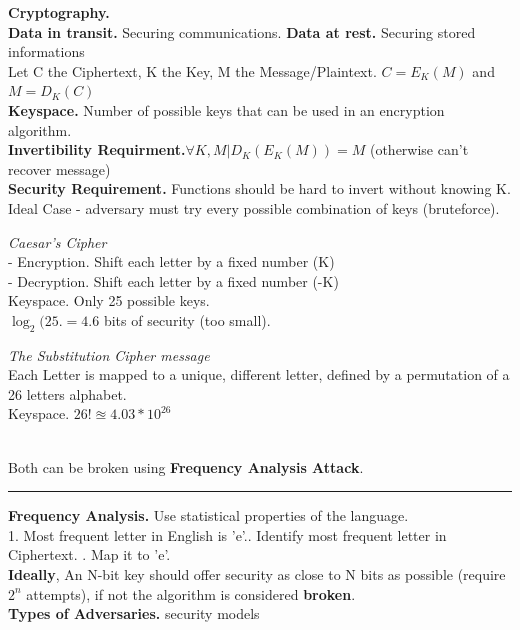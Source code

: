 \documentclass[9pt, a4paper]{extarticle}
\makeatletter
\renewcommand{\hline}{\noalign{\vskip 2px}\hrule\@height\arrayrulewidth\@width\linewidth\noalign{\vskip 2px}}
\makeatother
\begin{document}
\begin{minipage}[t]{0.495\textwidth}
	\vspace*{-7px}
	\textbf{Cryptography.}\\
	\textbf{Data in transit.} Securing communications. \textbf{Data at rest.} Securing stored informations\\
	Let C the Ciphertext, K the Key, M the Message/Plaintext.
	$C = E_K(M)$ and $M = D_K(C)$\\
	\textbf{Keyspace.} Number of possible keys that can be used in an encryption algorithm.\\
	\textbf{Invertibility Requirment.}$\forall K, M | D_K(E_K(M)) = M$ (otherwise can't recover message)\\
	\textbf{Security Requirement.} Functions should be hard to invert without knowing K.\\
	Ideal Case - adversary must try every possible combination of keys (bruteforce).\\[1px]
	\begin{minipage}[t]{0.6\textwidth}
		\textit{Caesar's Cipher}\\
		- Encryption. Shift each letter by a fixed number (K)\\
		- Decryption. Shift each letter by a fixed number (-K)\\
		Keyspace. Only 25 possible keys. \\$\log_{2}(25.=4.6$ bits of security (too small).
	\end{minipage}
	\begin{minipage}[t]{0.4\textwidth}
		\textit{The Substitution Cipher message}\\
		Each Letter is mapped to a unique, different letter, defined by a permutation of a 26 letters alphabet.\\
		Keyspace. $26! \approxeq 4.03*10^{26}$
	\end{minipage}\\
	Both can be broken using \textbf{Frequency Analysis Attack}.
	\hline
	\textbf{Frequency Analysis.} Use statistical properties of the language.\\
	1. Most frequent letter in English is 'e'.. Identify most frequent letter in Ciphertext. . Map it to 'e'.\\
	\textbf{Ideally}, An N-bit key should offer security as close to N bits as possible (require $2^n$ attempts), if not the algorithm is considered \textbf{broken}.\\
	\textbf{Types of Adversaries.} security models
	\begin{itemize}

\end{itemize}
\end{minipage}
\end{document}
